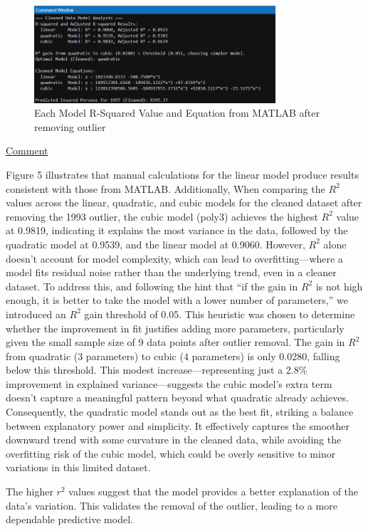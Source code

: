 \documentclass[12pt]{article}
\begin{document}
\begin{figure}[H]
    \centering
    \includegraphics[width=0.8\textwidth]{5.png}
    \caption{Each Model R-Squared Value and Equation from MATLAB after removing outlier}
\end{figure} 
\begin{adjustwidth}{0cm}{0cm}
\uline{Comment}
\end{adjustwidth}
Figure 5 illustrates that manual calculations for the linear model produce results consistent
with those from MATLAB. Additionally, When comparing the $R^2$ values across the linear, quadratic, and cubic models for the cleaned dataset after removing the 1993 outlier, the cubic model (poly3) achieves the highest $R^2$ value at 0.9819, indicating it explains the most variance in the data, followed by the quadratic model at 0.9539, and the linear model at 0.9060. However, $R^2$ alone doesn’t account for model complexity, which can lead to overfitting—where a model fits residual noise rather than the underlying trend, even in a cleaner dataset. To address this, and following the hint that ``if the gain in $R^2$ is not high enough, it is better to take the model with a lower number of parameters,'' we introduced an $R^2$ gain threshold of 0.05. This heuristic was chosen to determine whether the improvement in fit justifies adding more parameters, particularly given the small sample size of 9 data points after outlier removal. The gain in $R^2$ from quadratic (3 parameters) to cubic (4 parameters) is only 0.0280, falling below this threshold. This modest increase—representing just a 2.8\% improvement in explained variance—suggests the cubic model’s extra term doesn’t capture a meaningful pattern beyond what quadratic already achieves. Consequently, the quadratic model stands out as the best fit, striking a balance between explanatory power and simplicity. It effectively captures the smoother downward trend with some curvature in the cleaned data, while avoiding the overfitting risk of the cubic model, which could be overly sensitive to minor variations in this limited dataset.
\begin{adjustwidth}{0cm}{0cm}
The higher \(r^2\) values suggest that the model provides a better explanation of the data's
variation. This validates the removal of the outlier, leading to a more dependable predictive
model.
\end{adjustwidth}
\end{document}
